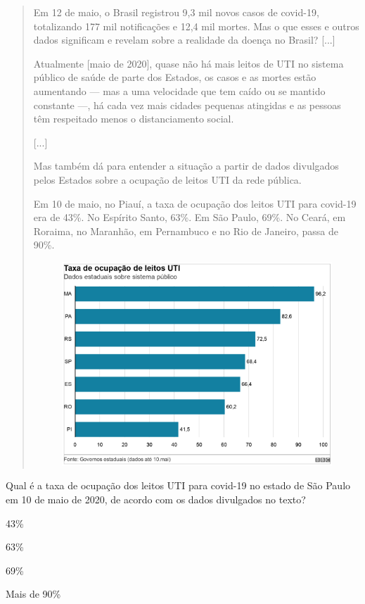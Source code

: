 \begin{quote}
Em 12 de maio, o Brasil registrou 9,3 mil novos casos de covid-19,
totalizando 177 mil notificações e 12,4 mil mortes. Mas o que esses e
outros dados significam e revelam sobre a realidade da doença no Brasil?
{[}...{]}

Atualmente {[}maio de 2020{]}, quase não há mais leitos de UTI no
sistema público de saúde de parte dos Estados, os casos e as mortes
estão aumentando --- mas a uma velocidade que tem caído ou se mantido
constante ---, há cada vez mais cidades pequenas atingidas e as pessoas
têm respeitado menos o distanciamento social.

{[}...{]}

Mas também dá para entender a situação a partir de dados divulgados
pelos Estados sobre a ocupação de leitos UTI da rede pública.

Em 10 de maio, no Piauí, a taxa de ocupação dos leitos UTI para covid-19
era de 43\%. No Espírito Santo, 63\%. Em São Paulo, 69\%. No Ceará, em
Roraima, no Maranhão, em Pernambuco e no Rio de Janeiro, passa de 90\%.

\begin{figure}[htpb!]
\includegraphics[width=.5\textwidth]{./imgs/img23.png}
\end{figure}

\end{quote}

Qual é a taxa de ocupação dos leitos UTI para covid-19 no estado de São
Paulo em 10 de maio de 2020, de acordo com os dados divulgados no texto?

\begin{escolha}
\item 43\%

\item 63\%

\item 69\%

\item Mais de 90\%
\end{escolha}

